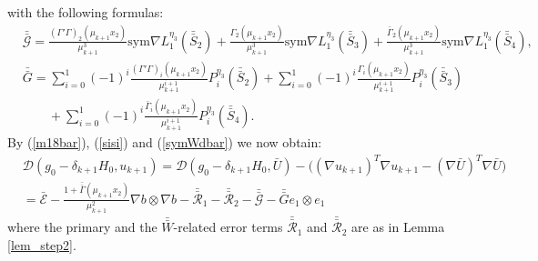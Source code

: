 \documentclass[reqno,twoside,11pt]{amsart}
\newcommand{\sym}{\mathrm{sym}}
\newcommand*{\dbar}[1]{\bar{\bar{#1}}}
\numberwithin{equation}{section}
\theoremstyle{plain}
\theoremstyle{definition}
\begin{document}
with the following formulas:
\begin{equation*}
\begin{split}
& \dbar{\mathcal{G}} = \frac{(\Gamma'\Gamma)_{2}(\mu_{k+1}x_2
  )}{\mu_{k+1}^{3}}\sym\nabla L_1^{\eta_3}(\dbar S_2) 
+ \frac{\Gamma_{2}(\mu_{k+1} x_2
  )}{\mu_{k+1}^{3}}\sym\nabla L_1^{\eta_3}(\dbar S_3) 
+ \frac{\bar\Gamma_{2}(\mu_{k+1} x_2
  )}{\mu_{k+1}^{3}}\sym\nabla L_1^{\eta_3}(\dbar S_4), \\
& \dbar G = \sum_{i=0}^1 (-1)^i \frac{(\Gamma'\Gamma)_{i}(\mu_{k+1}x_2
  )}{\mu_{k+1}^{i+1}}P_i^{\eta_3}(\dbar S_2) 
+ \sum_{i=0}^1 (-1)^i \frac{\Gamma_{i}(\mu_{k+1}x_2
  )}{\mu_{k+1}^{i+1}}P_i^{\eta_3}(\dbar S_3) 
\\ & \qquad + \sum_{i=0}^1 (-1)^i \frac{\bar\Gamma_{i}(\mu_{k+1} x_2
  )}{\mu_{k+1}^{i+1}}P_i^{\eta_3}(\dbar S_4). 
\end{split}
\end{equation*}
By (\ref{m18bar}), (\ref{sisi})  and (\ref{symWdbar}) we now obtain: 
\begin{equation}\label{m12dbar}
\begin{split}
& \mathcal{D}(g_0-\delta_{k+1}H_0, u_{k+1}) = \mathcal{D}(g_0-\delta_{k+1}H_0,
\bar U) -\big((\nabla u_{k+1})^T\nabla u_{k+1} - (\nabla \bar U)^T\nabla \bar U\big) \\ & =
\bar{\mathcal{E}} - 
\frac{1+\dbar\Gamma(\mu_{k+1}x_2)}{\mu_{k+1}^2}\nabla b\otimes\nabla
b - \dbar{\mathcal{R}}_1  - \dbar{\mathcal{R}}_2 -\dbar{\mathcal{G}}
-\dbar G e_1\otimes e_1
\end{split}
\end{equation}
where the primary and the $\dbar W$-related error terms
$\dbar{\mathcal{R}}_1$ and $\dbar{\mathcal{R}}_2$ are as in Lemma \ref{lem_step2}. 

\smallskip
\end{document}
